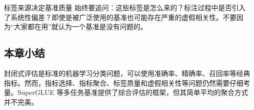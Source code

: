 \begin{warningbox}{标签来源决定基准质量}
始终要追问：这些标签是怎么来的？标注过程中是否引入了系统性偏差？即使是被广泛使用的基准也可能存在严重的虚假相关性。不要因为``大家都在用''就认为一个基准是没有问题的。
\end{warningbox}

\subsection{本章小结}

封闭式评估是标准的机器学习分类问题，可以使用准确率、精确率、召回率等经典指标。然而，指标选择、指标聚合、标签质量和虚假相关性等问题仍然需要仔细考量。SuperGLUE 等多任务基准提供了综合评估的框架，但其简单平均的聚合方式并不完美。


